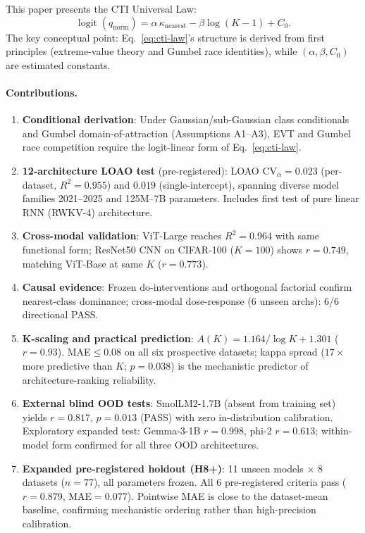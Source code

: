 \documentclass{article}
\DeclareMathOperator{\logit}{logit}
\begin{document}
This paper presents the CTI Universal Law:
\begin{equation}
\label{eq:cti-law}
\logit(q_{\mathrm{norm}})=\alpha\,\kappa_{\mathrm{nearest}}-\beta\log(K-1)+C_0.
\end{equation}
The key conceptual point: Eq.~\ref{eq:cti-law}'s structure is derived from first principles (extreme-value theory and Gumbel race identities), while $(\alpha,\beta,C_0)$ are estimated constants.

\paragraph{Contributions.}
\begin{enumerate}
\item \textbf{Conditional derivation}: Under Gaussian/sub-Gaussian class conditionals and Gumbel domain-of-attraction (Assumptions A1--A3), EVT and Gumbel race competition require the logit-linear form of Eq.~\ref{eq:cti-law}.
\item \textbf{12-architecture LOAO test} (pre-registered): LOAO $\mathrm{CV}_\alpha=0.023$ (per-dataset, $R^2=0.955$) and $0.019$ (single-intercept), spanning diverse model families 2021--2025 and 125M--7B parameters. Includes first test of pure linear RNN (RWKV-4) architecture.
\item \textbf{Cross-modal validation}: ViT-Large reaches $R^2=0.964$ with same functional form; ResNet50 CNN on CIFAR-100 ($K=100$) shows $r=0.749$, matching ViT-Base at same $K$ ($r=0.773$).
\item \textbf{Causal evidence}: Frozen do-interventions and orthogonal factorial confirm nearest-class dominance; cross-modal dose-response (6 unseen archs): 6/6 directional PASS.
\item \textbf{K-scaling and practical prediction}: $A(K)=1.164/\log K+1.301$ ($r=0.93$). MAE$\leq$0.08 on all six prospective datasets; kappa spread ($17\times$ more predictive than $K$; $p=0.038$) is the mechanistic predictor of architecture-ranking reliability.
\item \textbf{External blind OOD tests}: SmolLM2-1.7B (absent from training set) yields $r=0.817$, $p=0.013$ (PASS) with zero in-distribution calibration. Exploratory expanded test: Gemma-3-1B $r=0.998$, phi-2 $r=0.613$; within-model form confirmed for all three OOD architectures.
\item \textbf{Expanded pre-registered holdout (H8+)}: 11 unseen models $\times$ 8 datasets ($n=77$), all parameters frozen. All 6 pre-registered criteria pass ($r=0.879$, MAE$=0.077$). Pointwise MAE is close to the dataset-mean baseline, confirming mechanistic ordering rather than high-precision calibration.
\end{enumerate}
\end{document}

